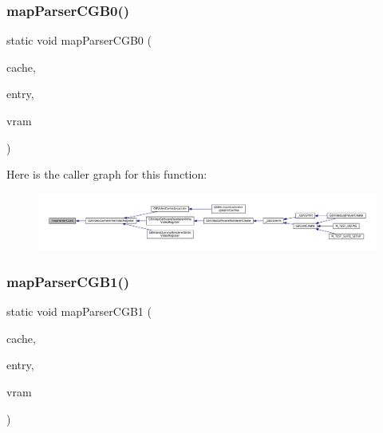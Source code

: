 \subsubsection{\texorpdfstring{map\+Parser\+C\+G\+B0()}{mapParserCGB0()}}
{\footnotesize\ttfamily static void map\+Parser\+C\+G\+B0 (\begin{DoxyParamCaption}\item[{struct m\+Map\+Cache $\ast$}]{cache,  }\item[{struct m\+Map\+Cache\+Entry $\ast$}]{entry,  }\item[{void $\ast$}]{vram }\end{DoxyParamCaption})\hspace{0.3cm}{\ttfamily [static]}}

Here is the caller graph for this function\+:
\nopagebreak
\begin{figure}[H]
\begin{center}
\leavevmode
\includegraphics[width=350pt]{gb_2renderers_2cache-set_8c_a7a94c69965062992b501b1ba7d9dfed3_icgraph}
\end{center}
\end{figure}
\mbox{\label{gb_2renderers_2cache-set_8c_a1120d205c5f595ef19ae432fc78b9d96}} 
\subsubsection{\texorpdfstring{map\+Parser\+C\+G\+B1()}{mapParserCGB1()}}
{\footnotesize\ttfamily static void map\+Parser\+C\+G\+B1 (\begin{DoxyParamCaption}\item[{struct m\+Map\+Cache $\ast$}]{cache,  }\item[{struct m\+Map\+Cache\+Entry $\ast$}]{entry,  }\item[{void $\ast$}]{vram }\end{DoxyParamCaption})\hspace{0.3cm}{\ttfamily [static]}}


